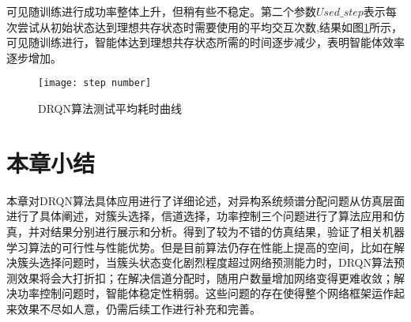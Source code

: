 可见随训练进行成功率整体上升，但稍有些不稳定。第二个参数$Used\_step$表示每次尝试从初始状态达到理想共存状态时需要使用的平均交互次数,结果如图\ref{fig:功率step}所示，可见随训练进行，智能体达到理想共存状态所需的时间逐步减少，表明智能体效率逐步增加。
\begin{figure}[htbp]
	\centering
	\texttt{[image: step number]}
	\caption{DRQN算法测试平均耗时曲线}
	\label{fig:功率step}
\end{figure}




\section{本章小结}
本章对DRQN算法具体应用进行了详细论述，对异构系统频谱分配问题从仿真层面进行了具体阐述，对簇头选择，信道选择，功率控制三个问题进行了算法应用和仿真，并对结果分别进行展示和分析。得到了较为不错的仿真结果，验证了相关机器学习算法的可行性与性能优势。但是目前算法仍存在性能上提高的空间，比如在解决簇头选择问题时，当簇头状态变化剧烈程度超过网络预测能力时，DRQN算法预测效果将会大打折扣；在解决信道分配时，随用户数量增加网络变得更难收敛；解决功率控制问题时，智能体稳定性稍弱。这些问题的存在使得整个网络框架运作起来效果不尽如人意，仍需后续工作进行补充和完善。



